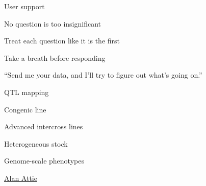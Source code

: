 \documentclass[12pt,t,aspectratio=169]{beamer}
\begin{document}
\begin{frame}{User support}

  \bbi
\item No question is too insignificant
\item Treat each question like it is the first
\item Take a breath before responding
\item ``Send me your data, and I'll try to figure out what's going on.''
  \ei

\end{frame}




\begin{frame}[c]{QTL mapping}

\vspace{5mm}
\end{frame}



\begin{frame}[c]{Congenic line}


\end{frame}




\begin{frame}[c]{Advanced intercross lines}


\end{frame}





\begin{frame}[c]{Heterogeneous stock}

  \vspace{2mm}


\end{frame}


\begin{frame}[c]{Genome-scale phenotypes}

\vspace*{5mm}

\hfill
\href{https://biochem.wisc.edu/faculty/attie}{\scriptsize \lolit Alan
  Attie} \hspace{8mm}

\end{frame}
\end{document}
